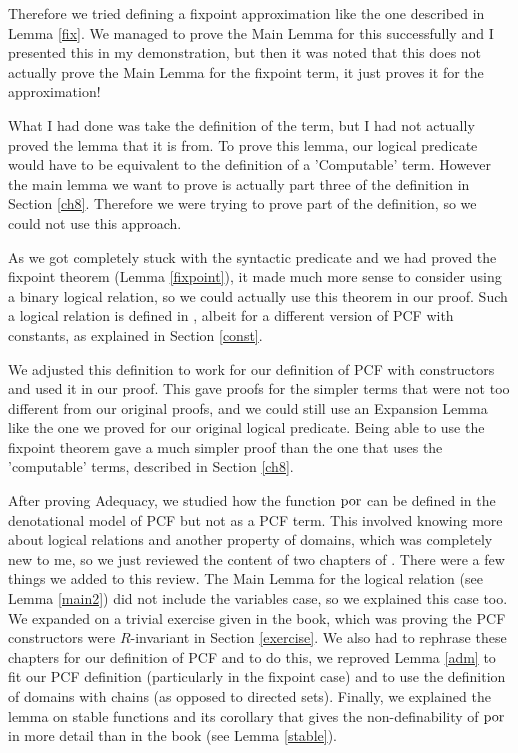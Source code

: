 Therefore we tried defining a fixpoint approximation like the one described in Lemma \ref{fix}. We managed to prove the Main Lemma for this successfully and I presented this in my demonstration, but then it was noted that this does not actually prove the Main Lemma for the fixpoint term, it just proves it for the approximation! 

What I had done was take the definition of the term, but I had not actually proved the lemma that it is from. To prove this lemma, our logical predicate would have to be equivalent to the definition of a 'Computable' term. However the main lemma we want to prove is actually part three of the definition in Section \ref{ch8}. Therefore we were trying to prove part of the definition, so we could not use this approach. 

As we got completely stuck with the syntactic predicate and we had proved the fixpoint theorem (Lemma \ref{fixpoint}), it made much more sense to consider using a binary logical relation, so we could actually use this theorem in our proof. Such a logical relation is defined in \citep{Streicher06} , albeit for a different version of PCF with constants, as explained in Section \ref{const}. 

We adjusted this definition to work for our definition of PCF with constructors and used it in our proof. This gave proofs for the simpler terms that were not too different from our  original proofs, and we could still use an Expansion Lemma like the one we proved for our original logical predicate. Being able to use the fixpoint theorem gave a much simpler proof than the one that uses the 'computable' terms, described in Section \ref{ch8}. 

After proving Adequacy, we studied how the function $\operatorname{por}$ can be defined in the denotational model of PCF but not as a PCF term. This involved knowing more about logical relations and another property of domains, which was completely new to me, so we just reviewed the content of two chapters of \citep{Streicher06}. There were a few things we added to this review. The Main Lemma for the logical relation (see Lemma \ref{main2}) did not include the variables case, so we explained this case too. We expanded on a trivial exercise given in the book, which was proving the PCF constructors were $R$-invariant in Section \ref{exercise}. We also had to rephrase these chapters for our definition of PCF and to do this, we reproved Lemma \ref{adm} to fit our PCF definition (particularly in the fixpoint case) and to use the definition of domains with chains (as opposed to directed sets). Finally, we explained the lemma on stable functions and its corollary that gives the non-definability of $\operatorname{por}$ in more detail than in the book (see Lemma \ref{stable}).

